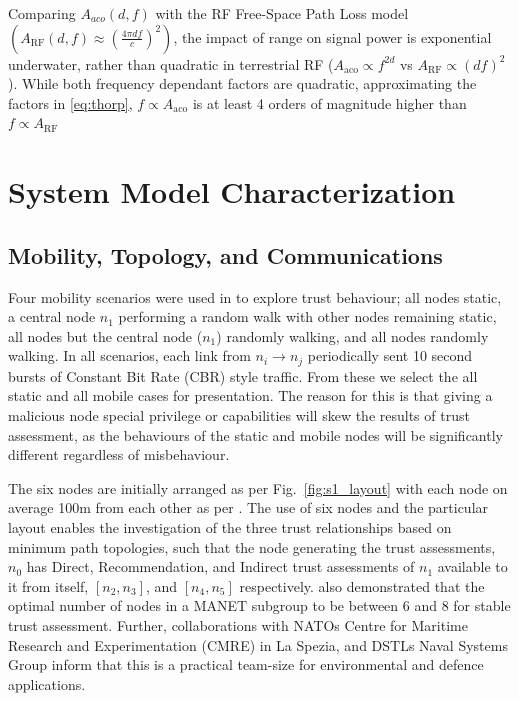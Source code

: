 \documentclass[conference]{IEEEtran}
\begin{document}
Comparing $A_{aco}(d,f)$ with the RF Free-Space Path Loss model $(A_{\text{RF}}(d,f) \approx \left( \frac{4\pi d f}{c} \right)^2)$, the impact of range on signal power is exponential underwater, rather than quadratic in terrestrial RF ($A_{\text{aco}} \propto f^{2d}$ vs $A_{\text{RF}} \propto (df)^2$). 
While both frequency dependant factors are quadratic, approximating the factors in \eqref{eq:thorp}, $f\propto A_{\text{aco}}$ is at least 4 orders of magnitude higher than $f\propto A_{\text{RF}}$

\section{System Model Characterization}\label{sec:initialsystemcharacterization}

\subsection{Mobility, Topology, and Communications}

Four mobility scenarios were used in \cite{Guo11} to explore trust behaviour; all nodes static, a central node $n_1$ performing a random walk with other nodes remaining static, all nodes but the central node ($n_1$) randomly walking, and all nodes randomly walking. 
In all scenarios, each link from $n_i \rightarrow n_j$ periodically sent 10 second bursts of Constant Bit Rate (CBR) style traffic.
From these we select the all static and all mobile cases for presentation.
The reason for this is that giving a malicious node special privilege or capabilities will skew the results of trust assessment, as the behaviours of the static and mobile nodes will be significantly different regardless of misbehaviour.

The six nodes are initially arranged as per Fig.~\ref{fig:s1_layout} with each node on average 100m from each other as per \cite{Guo11}.
The use of six nodes and the particular layout enables the investigation of the three trust relationships based on minimum path topologies, such that the node generating the trust assessments, $n_0$ has Direct, Recommendation, and Indirect trust assessments of $n_1$ available to it from itself, $[n_2,n_3]$, and $[n_4,n_5]$ respectively. 
\cite{Guo11} also demonstrated that the optimal number of nodes in a MANET subgroup to be between 6 and 8 for stable trust assessment. 
Further, collaborations with NATOs Centre for Maritime Research and Experimentation (CMRE) in La Spezia, and DSTLs Naval Systems Group inform that this is a practical team-size for environmental and defence applications.
\end{document}
